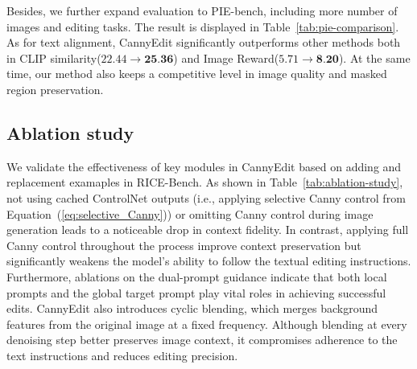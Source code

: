 \documentclass{article}
\begin{document}


Besides, we further expand evaluation to PIE-bench, including more number of images and editing tasks. The result is displayed in Table~\ref{tab:pie-comparison}. As for text alignment, CannyEdit significantly outperforms other methods both in CLIP similarity($22.44\rightarrow \textbf{25.36}$) and Image Reward($5.71\rightarrow \textbf{8.20}$). At the same time, our method also keeps a competitive level in image quality and masked region preservation. 

\subsection{Ablation study}

We validate the effectiveness of key modules in CannyEdit based on adding and replacement examaples in RICE-Bench.  As shown in Table~\ref{tab:ablation-study}, not using cached ControlNet outputs (i.e., applying selective Canny control from Equation~(\ref{eq:selective_Canny})) or omitting Canny control during image generation leads to a noticeable drop in context fidelity. In contrast, applying full Canny control throughout the process improve context preservation but significantly weakens the model's ability to follow the textual editing instructions.  Furthermore, ablations on the dual-prompt guidance indicate that both local prompts and the global target prompt play vital roles in achieving successful edits. CannyEdit also introduces cyclic blending, which merges background features from the original image at a fixed frequency. Although blending at every denoising step better preserves image context, it compromises adherence to the text instructions and reduces editing precision. 
\end{document}
